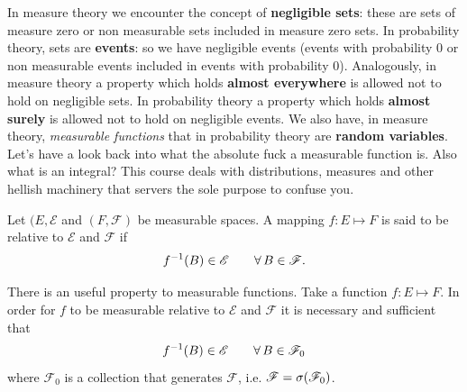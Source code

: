 \documentclass{report}
\begin{document}
In measure theory we encounter the concept of \textbf{negligible sets}: these are sets of measure zero or non measurable sets included in measure zero sets. In probability theory, sets are \textbf{events}: so we have negligible events (events with probability 0 or non measurable events included in events with probability 0). Analogously, in measure theory a property which holds \textbf{almost everywhere} is allowed not to hold on negligible sets. In probability theory a property which holds \textbf{almost surely} is allowed not to hold on negligible events.
We also have, in measure theory, \textit{measurable functions} that in probability theory are \textbf{random variables}.
Let's have a look back into what the absolute fuck a measurable function is. Also what is an integral? This course deals with distributions, measures and other hellish machinery that servers the sole purpose to confuse you.
\begin{revise}\label{measur}
	\begin{definition}
		Let $(E,\mathscr{E}$ and $(F,\mathscr{F})$ be measurable spaces. A mapping $f:E\mapsto F$ is said to be  relative to $\mathscr{E}$ and $\mathscr{F}$ if 
		\[f^{-1}(B)\in\mathscr{E}\qquad\forall\, B\in\mathscr{F}.\]
	\end{definition}
	There is an useful property to measurable functions. Take a function $f:E\mapsto F$. In order for $f$ to be measurable relative to $\mathscr{E}$ and $\mathscr{F}$ it is necessary and sufficient that
	\[f^{-1}(B)\in\mathscr{E}\qquad\forall\, B\in\mathscr{F}_0\]
	where $\mathscr{F}_0$ is a collection that generates $\mathscr{F}$, i.e. $\mathscr{F}=\sigma(\mathscr{F}_0)$.
\end{revise}
\end{document}
